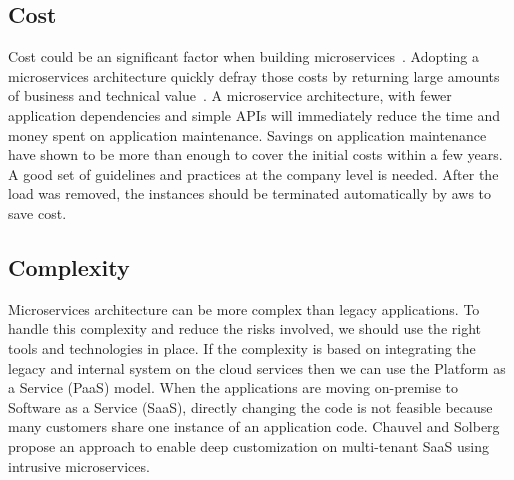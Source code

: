 \subsection{Cost}%
Cost could be an significant factor when building microservices~\cite{Michael2018, Netflix, Koschel2017}. 
%
Adopting a microservices architecture quickly defray those costs by returning large amounts of business and technical value~\cite{Leo2019, McElhiney2018}. A microservice architecture, with fewer application dependencies and simple APIs will immediately reduce the time and money spent on application maintenance. Savings on application maintenance have shown to be more than enough to cover the initial costs within a few years.\cite{Otharson2019} 
A good set of guidelines and practices at the company level is needed. After the load was removed, the instances should be terminated automatically by aws to save cost.\cite{McElhiney2018} 


\subsection{Complexity}%
Microservices architecture can be more complex than legacy applications. To handle this complexity and reduce the risks involved, we should use the right tools and technologies in place.
If the complexity is based on integrating the legacy and internal system on the cloud services then we can use the Platform as a Service (PaaS) model.\cite{rosa2018} When the applications are moving on-premise to Software as a Service (SaaS), directly changing the code is not feasible because many customers share one instance of an application code.
%
Chauvel and Solberg\cite{chauvel2018} propose an approach to enable deep customization on multi-tenant SaaS using intrusive microservices.

